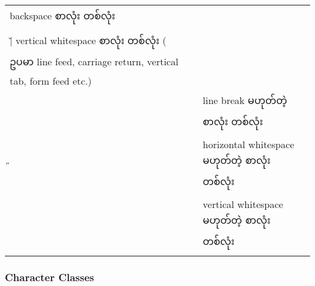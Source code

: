 \documentclass[11pt]{article}
\begin{document}
\begin{longtable}[c]{@{}ll@{}}
\begin{minipage}[t]{0.16\columnwidth}
backspace စာလုံး တစ်လုံး
\strut\end{minipage}\tabularnewline
\begin{minipage}[t]{0.17\columnwidth}\raggedright\strut
\v | vertical whitespace စာလုံး တစ်လုံး ( ဥပမာ line feed, carriage
return, vertical tab, form feed etc.)
\strut\end{minipage}\tabularnewline
\begin{minipage}[t]{0.17\columnwidth}\raggedright\strut
\N 
\strut\end{minipage} &
\begin{minipage}[t]{0.16\columnwidth}\raggedright\strut
line break မဟုတ်တဲ့ စာလုံး တစ်လုံး
\strut\end{minipage}\tabularnewline
\begin{minipage}[t]{0.17\columnwidth}\raggedright\strut
\H 
\strut\end{minipage} &
\begin{minipage}[t]{0.16\columnwidth}\raggedright\strut
horizontal whitespace မဟုတ်တဲ့ စာလုံး တစ်လုံး
\strut\end{minipage}\tabularnewline
\begin{minipage}[t]{0.17\columnwidth}\raggedright\strut
\V 
\strut\end{minipage} &
\begin{minipage}[t]{0.16\columnwidth}\raggedright\strut
vertical whitespace မဟုတ်တဲ့ စာလုံး တစ်လုံး
\strut\end{minipage}\tabularnewline
\bottomrule
\end{longtable}

    \subsubsection{Character Classes}\label{character-classes}
\end{document}
